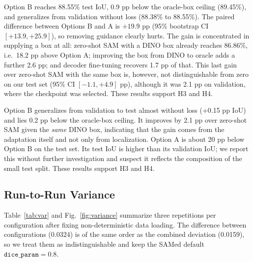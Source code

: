\documentclass[conference]{IEEEtran}
\begin{document}
Option B reaches 88.55\% test IoU, 0.9 pp below the oracle-box ceiling (89.45\%), and generalizes from validation without loss (88.38\% to 88.55\%). The paired difference between Options B and A is $+19.9$ pp (95\% bootstrap CI $[+13.9, +25.9]$), so removing guidance clearly hurts. The gain is concentrated in supplying a box at all: zero-shot SAM with a DINO box already reaches 86.86\%, i.e.\ 18.2 pp above Option A; improving the box from DINO to oracle adds a further 2.6 pp; and decoder fine-tuning recovers 1.7 pp of that. This last gain over zero-shot SAM with the same box is, however, not distinguishable from zero on our test set (95\% CI $[-1.1, +4.9]$ pp), although it was 2.1 pp on validation, where the checkpoint was selected. These results support H3 and H4.

Option B generalizes from validation to test almost without loss (+0.15 pp IoU) and lies 0.2 pp below the oracle-box ceiling. It improves by 2.1 pp over zero-shot SAM given the \emph{same} DINO box, indicating that the gain comes from the adaptation itself and not only from localization. Option A is about 20 pp below Option B on the test set. Its test IoU is higher than its validation IoU; we report this without further investigation and suspect it reflects the composition of the small test split. These results support H3 and H4.

\subsection{Run-to-Run Variance}

Table~\ref{tab:var} and Fig.~\ref{fig:variance} summarize three repetitions per configuration after fixing non-deterministic data loading. The difference between configurations (0.0324) is of the same order as the combined deviation (0.0159), so we treat them as indistinguishable and keep the SAMed default $\texttt{dice\_param}=0.8$.

\begin{table}[t]
\centering
\caption{Option A validation IoU over three runs.}
\label{tab:var}
\end{table}
\end{document}
